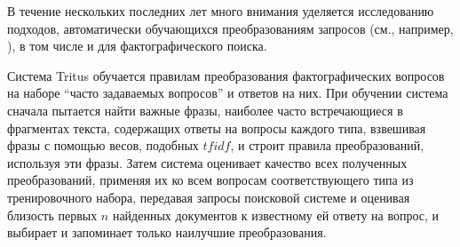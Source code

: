 \documentclass{article}
\begin{document}


В течение нескольких последних лет %
много внимания уделяется
исследованию подходов, автоматически обучающихся преобразованиям
запросов (см., например, \cite{glover:learning_qms}),
в том числе и для фактографического поиска.

Система Tritus \cite{qa:Tritus} обучается правилам преобразования
фактографических вопросов на наборе ``часто задаваемых вопросов'' и ответов на них.
При обучении система сначала пытается найти важные фразы, наиболее часто
встречающиеся в фрагментах текста, содержащих ответы на вопросы каждого
типа, взвешивая фразы с помощью весов, подобных $tfidf$, и строит
правила преобразований, используя эти фразы.
Затем система оценивает качество
всех полученных преобразований, применяя их ко всем вопросам
соответствующего типа из тренировочного набора,
передавая запросы поисковой системе и оценивая близость первых
$n$ найденных документов к известному ей ответу на вопрос, и выбирает и
запоминает только наилучшие преобразования.
\end{document}
